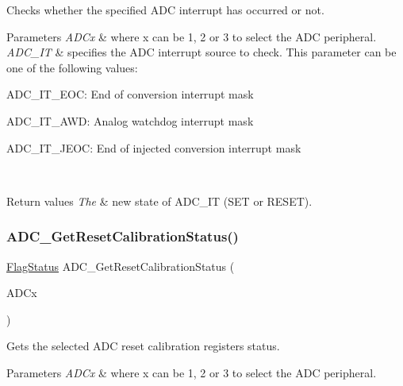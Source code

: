 Checks whether the specified A\+DC interrupt has occurred or not. 


\begin{DoxyParams}{Parameters}
{\em A\+D\+Cx} & where x can be 1, 2 or 3 to select the A\+DC peripheral. \\
\hline
{\em A\+D\+C\+\_\+\+IT} & specifies the A\+DC interrupt source to check. This parameter can be one of the following values\+: \begin{DoxyItemize}
\item A\+D\+C\+\_\+\+I\+T\+\_\+\+E\+OC\+: End of conversion interrupt mask \item A\+D\+C\+\_\+\+I\+T\+\_\+\+A\+WD\+: Analog watchdog interrupt mask \item A\+D\+C\+\_\+\+I\+T\+\_\+\+J\+E\+OC\+: End of injected conversion interrupt mask \end{DoxyItemize}
\\
\hline
\end{DoxyParams}

\begin{DoxyRetVals}{Return values}
{\em The} & new state of A\+D\+C\+\_\+\+IT (S\+ET or R\+E\+S\+ET). \\
\hline
\end{DoxyRetVals}
\mbox{\label{group___a_d_c___exported___functions_ga113be9fe25add8d7496bed659c68e02b}} 
\subsubsection{\texorpdfstring{ADC\_GetResetCalibrationStatus()}{ADC\_GetResetCalibrationStatus()}}
{\footnotesize\ttfamily \mbox{\hyperlink{group___exported__types_ga89136caac2e14c55151f527ac02daaff}{Flag\+Status}} A\+D\+C\+\_\+\+Get\+Reset\+Calibration\+Status (\begin{DoxyParamCaption}\item[{\mbox{\hyperlink{struct_a_d_c___type_def}{A\+D\+C\+\_\+\+Type\+Def}} $\ast$}]{A\+D\+Cx }\end{DoxyParamCaption})}



Gets the selected A\+DC reset calibration registers status. 


\begin{DoxyParams}{Parameters}
{\em A\+D\+Cx} & where x can be 1, 2 or 3 to select the A\+DC peripheral. \\
\hline
\end{DoxyParams}

